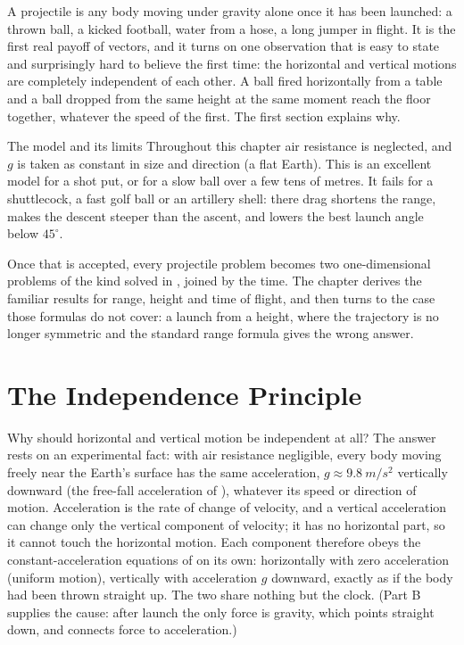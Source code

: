 \label{ch:projectiles}

A projectile is any body moving under gravity alone once it has been launched: a thrown ball, a kicked
football, water from a hose, a long jumper in flight. It is the first real payoff of vectors, and it
turns on one observation that is easy to state and surprisingly hard to believe the first time: the
horizontal and vertical motions are completely independent of each other. A ball fired horizontally
from a table and a ball dropped from the same height at the same moment reach the floor together,
whatever the speed of the first. The first section explains why.

\begin{remarkbox}{The model and its limits}
Throughout this chapter air resistance is neglected, and $g$ is taken as constant in size and direction
(a flat Earth). This is an excellent model for a shot put, or for a slow ball over a few tens of metres. It
fails for a shuttlecock, a fast golf ball or an artillery shell: there drag shortens the range, makes
the descent steeper than the ascent, and lowers the best launch angle below $45^\circ$.
\end{remarkbox}

Once that is accepted, every projectile problem becomes two one-dimensional problems of the kind solved in
, joined by the time. The chapter derives the familiar results for range, height and time of
flight, and then turns to the case those formulas do not cover: a launch from a height, where the
trajectory is no longer symmetric and the standard range formula gives the wrong answer.

\section{The Independence Principle}

Why should horizontal and vertical motion be independent at all? The answer rests on an experimental
fact: with air resistance negligible, every body moving freely near the Earth's surface has the same
acceleration, $g\approx\SI{9.8}{m/s^2}$ vertically downward (the free-fall acceleration of
), whatever its speed or direction of motion.
Acceleration is the rate of change of velocity, and a vertical acceleration can change only the vertical
component of velocity; it has no horizontal part, so it cannot touch the horizontal motion. Each
component therefore obeys the constant-acceleration equations of  on its own:
horizontally with zero acceleration (uniform motion), vertically with acceleration $g$ downward, exactly
as if the body had been thrown straight up. The two share nothing but the clock. (Part B supplies the cause: after launch the only force is
gravity, which points straight down, and  connects force to acceleration.)

